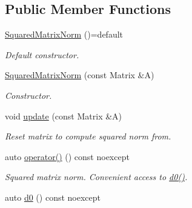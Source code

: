 \subsection*{Public Member Functions}
\begin{DoxyCompactItemize}
\item 
\hypertarget{structRFFGen_1_1LinearAlgebra_1_1SquaredMatrixNorm_a12a675f8253661fb62915ba3f6f2d6e6}{\hyperlink{structRFFGen_1_1LinearAlgebra_1_1SquaredMatrixNorm_a12a675f8253661fb62915ba3f6f2d6e6}{Squared\-Matrix\-Norm} ()=default}\label{structRFFGen_1_1LinearAlgebra_1_1SquaredMatrixNorm_a12a675f8253661fb62915ba3f6f2d6e6}

\begin{DoxyCompactList}\small\item\em Default constructor. \end{DoxyCompactList}\item 
\hyperlink{structRFFGen_1_1LinearAlgebra_1_1SquaredMatrixNorm_a32420aa809b04ad2ce2f72f6e93de2f3}{Squared\-Matrix\-Norm} (const Matrix \&A)
\begin{DoxyCompactList}\small\item\em Constructor. \end{DoxyCompactList}\item 
\hypertarget{structRFFGen_1_1LinearAlgebra_1_1SquaredMatrixNorm_a3b7bbeb2d36bea1117a551c8d168c4d6}{void \hyperlink{structRFFGen_1_1LinearAlgebra_1_1SquaredMatrixNorm_a3b7bbeb2d36bea1117a551c8d168c4d6}{update} (const Matrix \&A)}\label{structRFFGen_1_1LinearAlgebra_1_1SquaredMatrixNorm_a3b7bbeb2d36bea1117a551c8d168c4d6}

\begin{DoxyCompactList}\small\item\em Reset matrix to compute squared norm from. \end{DoxyCompactList}\item 
\hypertarget{structRFFGen_1_1LinearAlgebra_1_1SquaredMatrixNorm_a6aee4181a9dfb2a146f2cee3cca6a562}{auto \hyperlink{structRFFGen_1_1LinearAlgebra_1_1SquaredMatrixNorm_a6aee4181a9dfb2a146f2cee3cca6a562}{operator()} () const noexcept}\label{structRFFGen_1_1LinearAlgebra_1_1SquaredMatrixNorm_a6aee4181a9dfb2a146f2cee3cca6a562}

\begin{DoxyCompactList}\small\item\em Squared matrix norm. Convenient access to \hyperlink{structRFFGen_1_1LinearAlgebra_1_1SquaredMatrixNorm_abaa6151eafb9baefe973bd313920c92c}{d0()}. \end{DoxyCompactList}\item 
\hypertarget{structRFFGen_1_1LinearAlgebra_1_1SquaredMatrixNorm_abaa6151eafb9baefe973bd313920c92c}{auto \hyperlink{structRFFGen_1_1LinearAlgebra_1_1SquaredMatrixNorm_abaa6151eafb9baefe973bd313920c92c}{d0} () const noexcept}\label{structRFFGen_1_1LinearAlgebra_1_1SquaredMatrixNorm_abaa6151eafb9baefe973bd313920c92c}


\end{DoxyCompactItemize}
